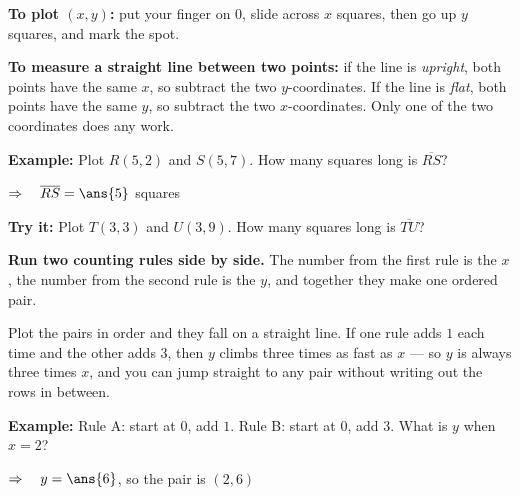 \documentclass[12pt]{article}
\begin{document}

\begin{formulabox}
\textbf{To plot $(x, y)$:} put your finger on $0$, slide across $x$ squares, then go up $y$
squares, and mark the spot.\par
\smallskip
\textbf{To measure a straight line between two points:} if the line is \emph{upright}, both
points have the same $x$, so subtract the two $y$-coordinates. If the line is \emph{flat},
both points have the same $y$, so subtract the two $x$-coordinates. Only one of the two
coordinates does any work.
\end{formulabox}

\begin{examplebox}
\textbf{Example:} \quad Plot $R(5, 2)$ and $S(5, 7)$. How many squares long is
$\overline{RS}$?

$\Rightarrow\quad \overline{RS} = \ans{5}$ squares
\end{examplebox}

\begin{tryitbox}
\textbf{Try it:} \quad Plot $T(3, 3)$ and $U(3, 9)$. How many squares long is
$\overline{TU}$?\\[2pt]
\end{tryitbox}


\begin{formulabox}
\textbf{Run two counting rules side by side.} The number from the first rule is the $x$, the
number from the second rule is the $y$, and together they make one ordered pair.\par
\smallskip
Plot the pairs in order and they fall on a straight line. If one rule adds $1$ each time
and the other adds $3$, then $y$ climbs three times as fast as $x$ --- so $y$ is always
three times $x$, and you can jump straight to any pair without writing out the rows in
between.
\end{formulabox}

\begin{examplebox}
\textbf{Example:} \quad Rule A: start at $0$, add $1$. Rule B: start at $0$, add $3$. What
is $y$ when $x = 2$?

$\Rightarrow\quad y = \ans{6}$, so the pair is $(2, 6)$
\end{examplebox}
\end{document}
